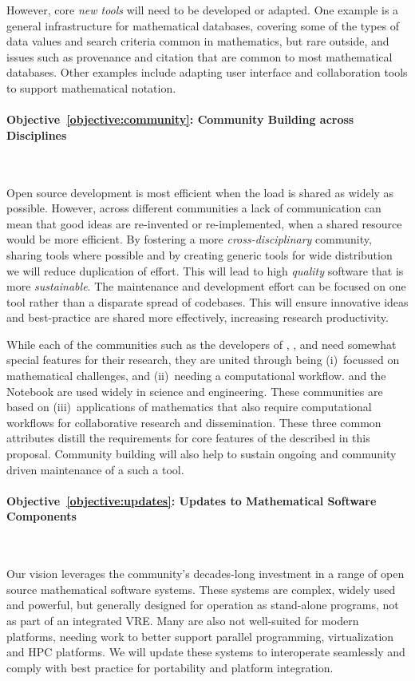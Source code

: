 \documentclass[noworkareas,deliverables,\classoptions]{euproposal}       %
\begin{document}
\begin{proposal}
However, core \emph{new tools} will need to be developed or
adapted. One example is a general infrastructure for mathematical
databases, covering some of the types of data values and search
criteria common in mathematics, but rare outside, and issues such as
provenance and citation that are common to most mathematical
databases. Other examples include adapting user interface and
collaboration tools to support mathematical notation. 

\paragraph{Objective~\ref{objective:community}: Community Building across Disciplines}\ 

Open source development is most efficient when the load is shared as
widely as possible. However, across different communities a lack of
communication can mean that good ideas are re-invented or
re-implemented, when a shared resource would be more efficient. By
fostering a more \emph{cross-disciplinary} community, sharing tools
where possible and by creating generic tools for wide distribution we
will reduce duplication of effort. This will lead to high
\emph{quality} software that is more \emph{sustainable}. The
maintenance and development effort can be focused on one tool rather
than a disparate spread of codebases. This will ensure innovative
ideas and best-practice are shared more effectively, increasing
research productivity.

While each of the communities such as the developers of \Sage,
\Singular, and \GAP need somewhat special features for their research,
they are united through being (i)~focussed on mathematical challenges,
and (ii)~needing a computational workflow. \IPython and the \Jupyter
Notebook are used widely in science and engineering. These communities
are based on (iii)~applications of mathematics that also require
computational workflows for collaborative research and
dissemination. These three common attributes distill the requirements
for core features of the \VREs described in this proposal. Community
building will also help to sustain ongoing and community driven
maintenance of a such a tool.


\paragraph{Objective~\ref{objective:updates}: Updates to Mathematical
  Software Components}\

Our vision leverages the community's decades-long investment in a
range of open source mathematical software systems. These systems are
complex, widely used and powerful, but generally designed for
operation as stand-alone programs, not as part of an integrated
VRE. Many are also not well-suited for modern platforms, needing work
to better support parallel programming, virtualization and HPC
platforms. We will update these systems to interoperate seamlessly and
comply with best practice for portability and platform integration.



\end{proposal}
\end{document}

